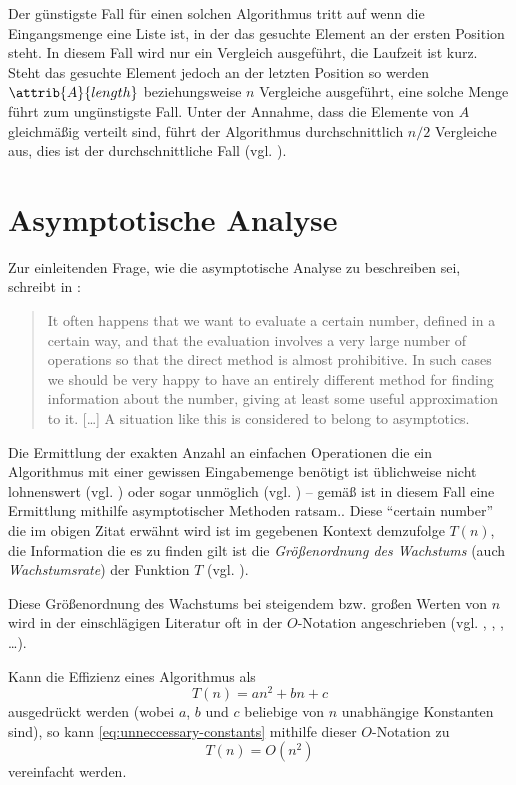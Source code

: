 Der günstigste Fall für einen solchen Algorithmus tritt auf wenn die Eingangsmenge eine Liste ist, in der das gesuchte Element an der ersten Position steht. In diesem Fall wird nur ein Vergleich ausgeführt, die Laufzeit ist kurz. Steht das gesuchte Element jedoch an der letzten Position so werden $\attrib{A}{length}$ beziehungsweise $n$ Vergleiche ausgeführt, eine solche Menge führt zum ungünstigste Fall. Unter der Annahme, dass die Elemente von $A$ gleichmäßig verteilt sind, führt der Algorithmus durchschnittlich $n/2$ Vergleiche aus, dies ist der durchschnittliche Fall (vgl. \cite[59]{sha2011}).

\section{Asymptotische Analyse}

Zur einleitenden Frage, wie die asymptotische Analyse zu beschreiben sei, schreibt \citeauthor{bru1958} in :

\blockquote[{\cite[1]{bru1958}}]{It often happens that we want to evaluate a certain number, defined in a certain way, and that the evaluation involves a very large number of operations so that the direct method is almost prohibitive. In such cases we should be very happy to have an entirely different method for finding information about the number, giving at least some useful approximation to it. [\ldots] A situation like this is considered to belong to asymptotics.}

Die Ermittlung der exakten Anzahl an einfachen Operationen die ein Algorithmus mit einer gewissen Eingabemenge benötigt ist üblichweise nicht lohnenswert (vgl. \cite[28]{hsr1997}) oder sogar unmöglich (vgl. \cite[37]{meh1984}) -- gemäß \citeauthor{bru1958} ist in diesem Fall eine Ermittlung mithilfe asymptotischer Methoden ratsam.. Diese \enquote{certain number} die im obigen Zitat erwähnt wird ist im gegebenen Kontext demzufolge $T(n)$, die Information die es zu finden gilt ist die \emph{Größenordnung des Wachstums} (auch \emph{Wachstumsrate}) der Funktion $T$ (vgl. \cite[63]{sha2011}).

Diese Größenordnung des Wachstums bei steigendem bzw. großen Werten von $n$ wird in der einschlägigen Literatur oft in der $O$-Notation angeschrieben (vgl. \cite[2]{ahu1974}, \cite[107]{taocp1}, \cite[29]{hsr1997}, \ldots).

Kann die Effizienz eines Algorithmus als
\begin{equation}\label{eq:unneccessary-constants}
    T(n) = an^2 + bn + c
\end{equation}
ausgedrückt werden (wobei $a$, $b$ und $c$ beliebige von $n$ unabhängige Konstanten sind), so kann \eqref{eq:unneccessary-constants} mithilfe dieser $O$-Notation zu
\begin{equation}\label{eq:basic-o-notation}
    T(n) = O(n^2)
\end{equation}
vereinfacht werden.

